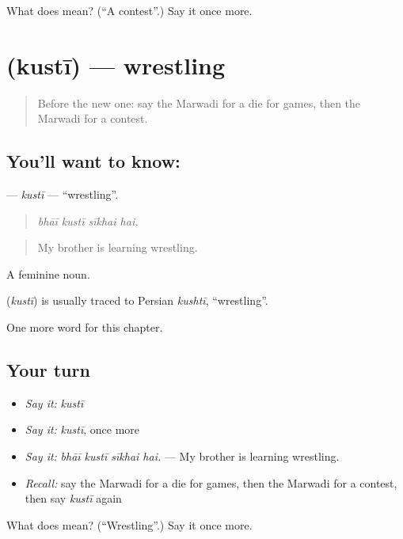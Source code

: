 \begin{tcolorbox}[breakable,colback=teal!4,colframe=teal!35!black,title={Before you move on}]
What does  mean? (\textquotedblleft{}A contest\textquotedblright{}.) Say it once more.
\end{tcolorbox}
\section[\texorpdfstring{\mw{कुस्ती} (kustī)}{कुस्ती (kustī)}]{ (kustī) — wrestling}

\label{lesson:MW-C279-kusti}



\begin{quote}
Before the new one: say the Marwadi for a die for games, then the Marwadi for a contest.
\end{quote}

\subsection*{You'll want to know: }
\textbf{} — \emph{kustī} — \textquotedblleft{}wrestling\textquotedblright{}.

\begin{quote}
   
\end{quote}

\begin{quote}
\emph{bhāī kustī sīkhai hai.}
\end{quote}

\begin{quote}
My brother is learning wrestling.
\end{quote}

A feminine noun.

\begin{cousinweb}
\textbf{} (\emph{kustī}) is usually traced to Persian \emph{kushtī}, \textquotedblleft{}wrestling\textquotedblright{}.
\end{cousinweb}

\begin{grammarlens}[title={What you've built}]
One more word for this chapter.
\end{grammarlens}

\subsection*{Your turn}
\begin{itemize}
\raggedright
  \item \emph{Say it:} \emph{kustī}
  \item \emph{Say it:} \emph{kustī}, once more
  \item \emph{Say it:} \emph{bhāī kustī sīkhai hai.} — My brother is learning wrestling.
  \item \emph{Recall:} say the Marwadi for a die for games, then the Marwadi for a contest, then say \emph{kustī} again
\end{itemize}

\begin{tcolorbox}[breakable,colback=teal!4,colframe=teal!35!black,title={Before you move on}]
What does  mean? (\textquotedblleft{}Wrestling\textquotedblright{}.) Say it once more.
\end{tcolorbox}
